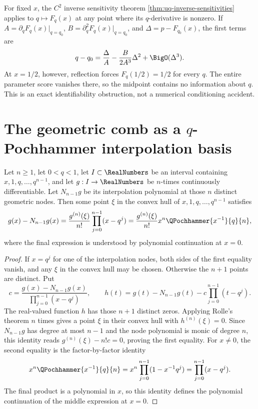 For fixed \(x\), the \(C^2\) inverse sensitivity theorem
\cref{thm:uq-inverse-sensitivities} applies to \(q\mapsto F_q(x)\) at any point
where its \(q\)-derivative is nonzero.  If
\(A=\partial_qF_q(x)|_{q=q_0}\), \(B=\partial_q^2F_q(x)|_{q=q_0}\), and
\(\Delta=p-F_{q_0}(x)\), the first terms are
\[
 q-q_0=\frac\Delta A-\frac{B}{2A^3}\Delta^2+\BigO(\Delta^3).
\]
At \(x=1/2\), however, reflection forces \(F_q(1/2)=1/2\) for every \(q\).
The entire parameter score vanishes there, so the midpoint contains no
information about \(q\).  This is an exact identifiability obstruction, not a
numerical conditioning accident.

\section{The geometric comb as a \(q\)-Pochhammer interpolation basis}
\label{sec:fr-geometric-interpolation}

\begin{proposition}
\label{prop:fr-newton-qpochhammer}
Let \(n\ge1\), let \(0<q<1\), let \(I\subset\RealNumbers\) be an interval containing
\(x,1,q,\ldots,q^{n-1}\), and let \(g:I\to\RealNumbers\) be \(n\)-times continuously
differentiable.  Let \(N_{n-1}g\) be its interpolation polynomial at those
\(n\) distinct geometric nodes.  Then some point \(\xi\) in the convex hull of
\(x,1,q,\ldots,q^{n-1}\) satisfies
\begin{equation}
 g(x)-N_{n-1}g(x)
 =\frac{g^{(n)}(\xi)}{n!}
 \prod_{j=0}^{n-1}(x-q^j)
 =\frac{g^{(n)}(\xi)}{n!}x^n\QPochhammer{x^{-1}}{q}{n},
 \label{eq:fr-newton-qpochhammer}
\end{equation}
where the final expression is understood by polynomial continuation at
\(x=0\).
\end{proposition}

\begin{proof}
If \(x=q^j\) for one of the interpolation nodes, both sides of the first
equality vanish, and any \(\xi\) in the convex hull may be chosen.  Otherwise
the \(n+1\) points are distinct.  Put
\[
 c=\frac{g(x)-N_{n-1}g(x)}{\prod_{j=0}^{n-1}(x-q^j)},
 \qquad
 h(t)=g(t)-N_{n-1}g(t)-c\prod_{j=0}^{n-1}(t-q^j).
\]
The real-valued function \(h\) has those \(n+1\) distinct zeros.  Applying
Rolle's theorem \(n\) times gives a point \(\xi\) in their convex hull with
\(h^{(n)}(\xi)=0\).  Since \(N_{n-1}g\) has degree at most \(n-1\) and the
node polynomial is monic of degree \(n\), this identity reads
\(g^{(n)}(\xi)-n!c=0\), proving the first equality.  For \(x\ne0\), the second
equality is the factor-by-factor identity
\[
 x^n\QPochhammer{x^{-1}}{q}{n}
 =x^n\prod_{j=0}^{n-1}(1-x^{-1}q^j)
 =\prod_{j=0}^{n-1}(x-q^j).
\]
The final product is a polynomial in \(x\), so this identity defines the
polynomial continuation of the middle expression at \(x=0\).
\end{proof}

